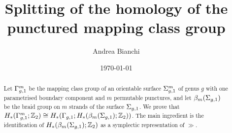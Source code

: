\documentclass{amsart}
\theoremstyle{plain}
\theoremstyle{definition}
\begin{document}
\title{Splitting of the homology of the punctured mapping class group}

\author{Andrea Bianchi}

\address{Mathematics Institute,
University of Bonn,
Endenicher Allee 60, Bonn,
Germany
}




\date{\today}



\begin{abstract}
Let $\Gamma_{g,1}^m$ be the mapping class group of an orientable surface $\Sigma_{g,1}^m$ of genus $g$ with one parametrised
boundary component and $m$ permutable punctures, and let $\beta_{m}(\Sigma_{g,1})$ be the braid group on $m$ strands
of the surface $\Sigma_{g,1}$. We prove that $H_*(\Gamma_{g,1}^m;\mathbb{Z}_2)\cong H_*(\Gamma_{g,1};H_*(\beta_{m}(\Sigma_{g,1});\mathbb{Z}_2))$. The main ingredient
is the identification of $H_*(\beta_{m}(\Sigma_{g,1});\mathbb{Z}_2)$ as a symplectic representation of $\gg$.
\end{abstract}


\maketitle










% 
% 
% 

% 
% 

{}

\end{document}
